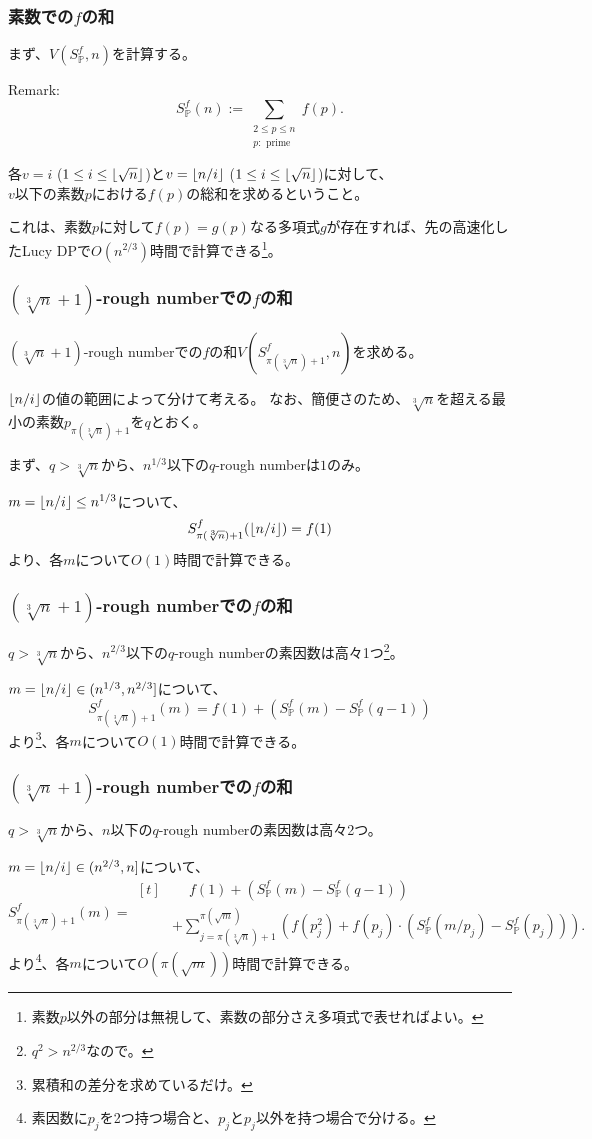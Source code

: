 \documentclass[
  lualatex,
  ja=standard,
  compress,
  hyperref={colorlinks, urlcolor=magenta, linkcolor=blue!55!black},
  dvipsnames,
  svgnames,
]{beamer}
\begin{document}
\begin{frame}
  \frametitle{素数での$f$の和}

  まず、$V(S_{\mathbb{P}}^f, n)$を計算する。

  Remark:
  $$
  S_{\mathbb{P}}^f(n) := \sum_{\substack{2\le p\le n\\p:\text{ prime}}} f(p).
  $$

  各$v=i$ ($1\le i\le\lfloor\sqrt{n}\rfloor$)と$v=\lfloor n/i\rfloor$ ($1\le i\le\lfloor\sqrt{n}\rfloor$)に対して、\\$v$以下の素数$p$における$f(p)$の総和を求めるということ。

  これは、素数$p$に対して$f(p)=g(p)$なる多項式$g$が存在すれば、先の高速化したLucy DPで$O(n^{2/3})$時間で計算できる\footnote{素数$p$以外の部分は無視して、素数の部分さえ多項式で表せればよい。}。
\end{frame}

\setcounter{slidetopic}{0}
\begin{frame}
  \frametitle{$(\sqrt[3]{n}+1)$-rough numberでの$f$の和 \theslidetopic}

  $(\sqrt[3]{n}+1)$-rough numberでの$f$の和$V(S_{\pi(\sqrt[3]{n})+1}^f, n)$を求める。

  $\lfloor n/i\rfloor$の値の範囲によって分けて考える。
  なお、簡便さのため、$\sqrt[3]{n}$を超える最小の素数$p_{\pi(\sqrt[3]{n})+1}$を$q$とおく。

  まず、$q>\sqrt[3]{n}$から、$n^{1/3}$以下の$q$-rough numberは$1$のみ。

  $m = \lfloor n/i\rfloor \le n^{1/3}$について、
  $$ S_{\pi(\sqrt[3]{n})+1}^f(\lfloor n/i\rfloor) = f(1) $$
  より、各$m$について$O(1)$時間で計算できる。
\end{frame}

\begin{frame}
  \frametitle{$(\sqrt[3]{n}+1)$-rough numberでの$f$の和 \theslidetopic}

  $q>\sqrt[3]{n}$から、$n^{2/3}$以下の$q$-rough numberの素因数は高々1つ\footnote{$q^2>n^{2/3}$なので。}。

  $m = \lfloor n/i\rfloor \in (n^{1/3}, n^{2/3}]$について、
  $$
  S_{\pi(\sqrt[3]{n})+1}^f(m)
  = f(1) + (S_{\mathbb{P}}^f(m) - S_{\mathbb{P}}^f(q-1))
  $$
  より\footnote{累積和の差分を求めているだけ。}、各$m$について$O(1)$時間で計算できる。
\end{frame}

\begin{frame}
  \frametitle{$(\sqrt[3]{n}+1)$-rough numberでの$f$の和 \theslidetopic}

  $q>\sqrt[3]{n}$から、$n$以下の$q$-rough numberの素因数は高々2つ。

  $m = \lfloor n/i\rfloor \in (n^{2/3}, n]$について、
  $$
  S_{\pi(\sqrt[3]{n})+1}^f(m) = 
  \begin{aligned}[t]
    &\phantom{{}+{}} f(1)
    + (S_{\mathbb{P}}^f(m) - S_{\mathbb{P}}^f(q-1)) \\
    &+ \sum_{j=\pi(\sqrt[3]{n})+1}^{\pi(\sqrt{m})} \left(f(p_j^2) + f(p_j)\cdot(S_{\mathbb{P}}^f(m/p_j)-S_{\mathbb{P}}^f(p_j)) \right).
  \end{aligned}
  $$
  より\footnote{素因数に$p_j$を2つ持つ場合と、$p_j$と$p_j$以外を持つ場合で分ける。}、各$m$について$O(\pi(\sqrt{m}))$時間で計算できる。
\end{frame}
\end{document}
